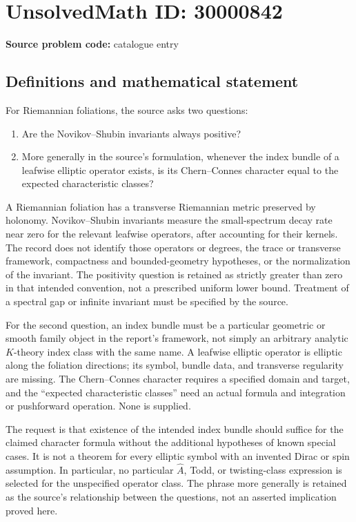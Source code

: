 \documentclass[11pt]{article}
\begin{document}
\section*{UnsolvedMath ID: 30000842}
\textbf{Source problem code:} catalogue entry
\subsection{Definitions and mathematical statement}
For Riemannian foliations, the source asks two questions:
\begin{enumerate}
\item Are the Novikov--Shubin invariants always positive?
\item More generally in the source's formulation, whenever the index bundle of a leafwise elliptic operator exists, is its Chern--Connes character equal to the expected characteristic classes?
\end{enumerate}

A Riemannian foliation has a transverse Riemannian metric preserved by holonomy. Novikov--Shubin invariants measure the small-spectrum decay rate near zero for the relevant leafwise operators, after accounting for their kernels. The record does not identify those operators or degrees, the trace or transverse framework, compactness and bounded-geometry hypotheses, or the normalization of the invariant. The positivity question is retained as strictly greater than zero in that intended convention, not a prescribed uniform lower bound. Treatment of a spectral gap or infinite invariant must be specified by the source.

For the second question, an index bundle must be a particular geometric or smooth family object in the report's framework, not simply an arbitrary analytic $K$-theory index class with the same name. A leafwise elliptic operator is elliptic along the foliation directions; its symbol, bundle data, and transverse regularity are missing. The Chern--Connes character requires a specified domain and target, and the ``expected characteristic classes'' need an actual formula and integration or pushforward operation. None is supplied.

The request is that existence of the intended index bundle should suffice for the claimed character formula without the additional hypotheses of known special cases. It is not a theorem for every elliptic symbol with an invented Dirac or spin assumption. In particular, no particular $\widehat A$, Todd, or twisting-class expression is selected for the unspecified operator class. The phrase more generally is retained as the source's relationship between the questions, not an asserted implication proved here.
\end{document}
